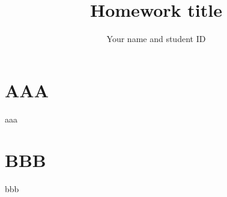 \documentclass[10pt,twocolumn,letterpaper]{article}
\title{Homework title}
\author{Your name and student ID
}
\begin{document}
\maketitle

\section{AAA}
aaa

\section{BBB}
bbb



{
    \small
    
    
}
\end{document}
